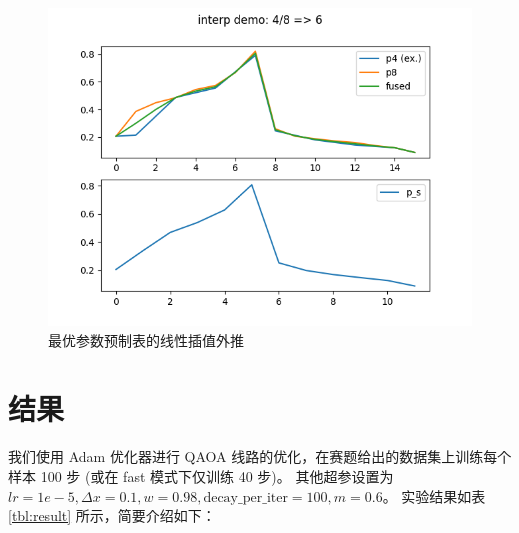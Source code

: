 \documentclass[withoutpreface,bwprint]{cumcmthesis}
\begin{document}
\begin{figure}[h!]
	\centering
	\includegraphics[scale=0.6]{figures/interp.png}
	\caption{最优参数预制表的线性插值外推}
	\label{fig:expolate}
\end{figure}


\section{结果}

我们使用 Adam 优化器进行 QAOA 线路的优化，在赛题给出的数据集上训练每个样本 100 步 (或在 fast 模式下仅训练 40 步)。
其他超参设置为 $ lr = 1e-5, \Delta x = 0.1, w = 0.98, \mathrm{decay\_per\_iter} = 100, m = 0.6 $。
实验结果如表 \ref{tbl:result} 所示，简要介绍如下：
\end{document}

